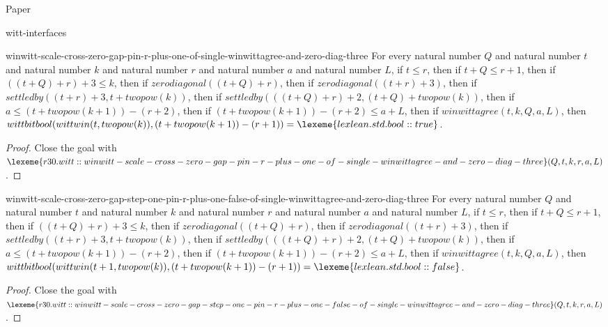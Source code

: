 \begin{lexlean}{Paper}
\begin{section}{witt-interfaces}
  \begin{theorem}{winwitt-scale-cross-zero-gap-pin-r-plus-one-of-single-winwittagree-and-zero-diag-three}
  For every natural number \(Q\) and natural number \(t\) and natural number \(k\) and natural number \(r\) and natural number \(a\) and natural number \(L\), if \(t ≤ r\), then if \(t + Q ≤ r + 1\), then if \(((t + Q) + r) + 3 ≤ k\), then if \(zerodiagonal((t + Q) + r)\), then if \(zerodiagonal((t + r) + 3)\), then if \(settledby((t + r) + 3, t + twopow(k))\), then if \(settledby(((t + Q) + r) + 2, (t + Q) + twopow(k))\), then if \(a ≤ (t + twopow(k + 1)) - (r + 2)\), then if \((t + twopow(k + 1)) - (r + 2) ≤ a + L\), then if \(winwittagree(t, k, Q, a, L)\), then \(wittbitbool(wittwin(t, twopow(k)), (t + twopow(k + 1)) - (r + 1)) = \lexeme{lexlean.std.bool::true}\).
  \begin{proof}
  Close the goal with \(\lexeme{r30.witt::winwitt-scale-cross-zero-gap-pin-r-plus-one-of-single-winwittagree-and-zero-diag-three}(Q, t, k, r, a, L)\).
  \end{proof}
  \end{theorem}

  \begin{theorem}{winwitt-scale-cross-zero-gap-step-one-pin-r-plus-one-false-of-single-winwittagree-and-zero-diag-three}
  For every natural number \(Q\) and natural number \(t\) and natural number \(k\) and natural number \(r\) and natural number \(a\) and natural number \(L\), if \(t ≤ r\), then if \(t + Q ≤ r + 1\), then if \(((t + Q) + r) + 3 ≤ k\), then if \(zerodiagonal((t + Q) + r)\), then if \(zerodiagonal((t + r) + 3)\), then if \(settledby((t + r) + 3, t + twopow(k))\), then if \(settledby(((t + Q) + r) + 2, (t + Q) + twopow(k))\), then if \(a ≤ (t + twopow(k + 1)) - (r + 2)\), then if \((t + twopow(k + 1)) - (r + 2) ≤ a + L\), then if \(winwittagree(t, k, Q, a, L)\), then \(wittbitbool(wittwin(t + 1, twopow(k)), (t + twopow(k + 1)) - (r + 1)) = \lexeme{lexlean.std.bool::false}\).
  \begin{proof}
  Close the goal with \(\lexeme{r30.witt::winwitt-scale-cross-zero-gap-step-one-pin-r-plus-one-false-of-single-winwittagree-and-zero-diag-three}(Q, t, k, r, a, L)\).
  \end{proof}
  \end{theorem}


\end{section}
\end{lexlean}
